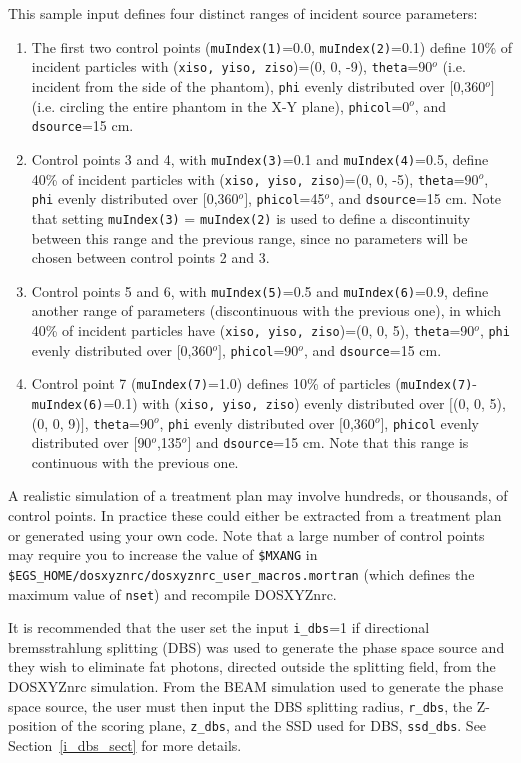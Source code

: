 \documentclass[12pt,twoside]{article}      %
\newcommand{\indexm}[1]{\index{#1}}
\begin{document}
This sample input defines
four distinct ranges of incident source parameters:

\begin{enumerate}
\item The first two control points ({\tt muIndex(1)}=0.0, {\tt muIndex(2)}=0.1) define 10\% of incident particles
with ({\tt xiso, yiso, ziso})=(0, 0, -9), {\tt theta}=90$^o$ (i.e. incident
from the side of the phantom), {\tt phi} evenly distributed over $[$0,360$^o]$ (i.e. circling the entire phantom in the X-Y plane), {\tt phicol}=0$^o$, and {\tt dsource}=15 cm.
\item Control points 3 and 4, with {\tt muIndex(3)}=0.1 and {\tt muIndex(4)}=0.5, define 40\% of incident particles with
({\tt xiso, yiso, ziso})=(0, 0, -5), {\tt theta}=90$^o$, {\tt phi} evenly distributed over $[$0,360$^o]$, {\tt phicol}=45$^o$, and {\tt dsource}=15 cm.  Note that setting {\tt muIndex(3)} = {\tt muIndex(2)} is used to define a discontinuity between
this range and the previous range, since no parameters will be chosen between control points 2 and 3.
\item Control points 5 and 6, with {\tt muIndex(5)}=0.5 and {\tt muIndex(6)}=0.9, define another range of parameters
(discontinuous with the previous one), in which 40\% of incident particles have
({\tt xiso, yiso, ziso})=(0, 0, 5), {\tt theta}=90$^o$, {\tt phi} evenly distributed over $[$0,360$^o]$, {\tt phicol}=90$^o$, and
{\tt dsource}=15 cm.
\item Control point 7 ({\tt muIndex(7)}=1.0) defines 10\% of particles ({\tt muIndex(7)}-{\tt muIndex(6)}=0.1) with
({\tt xiso, yiso, ziso}) evenly distributed over $[$(0, 0, 5),(0, 0, 9)$]$, {\tt theta}=90$^o$, {\tt phi} evenly distributed over $[$0,360$^o]$, {\tt phicol} evenly distributed over $[$90$^o$,135$^o]$ and {\tt dsource}=15 cm.  Note that this range is
continuous with the previous one.
\end{enumerate}

A realistic simulation of a treatment plan may involve hundreds, or thousands, of control points.  In practice these could
either be extracted from a treatment plan or generated using your own code\cite{LP10}.  Note that a large number of
control points may require you to increase the value of {\tt \$MXANG} in {\tt \$EGS\_HOME/dosxyznrc/dosxyznrc\_user\_macros.mortran} (which defines the maximum value of {\tt nset}) and recompile DOSXYZnrc. \indexm{\$MXANG}

\indexm{i\_dbs}
\indexm{z\_dbs}
\indexm{ssd\_dbs}
\indexm{r\_dbs}
It is recommended that the user set the input {\tt i\_dbs}=1 if directional bremsstrahlung splitting (DBS) was used
to generate the phase space source and they wish to eliminate fat photons, directed outside the splitting field, from
the DOSXYZnrc simulation.  From the BEAM simulation used to generate the phase space source, the user must then input
the DBS splitting radius, {\tt r\_dbs}, the Z-position of the scoring plane, {\tt z\_dbs}, and the SSD used for
DBS, {\tt ssd\_dbs}.  See Section~\ref{i_dbs_sect} for more details.
\end{document}

